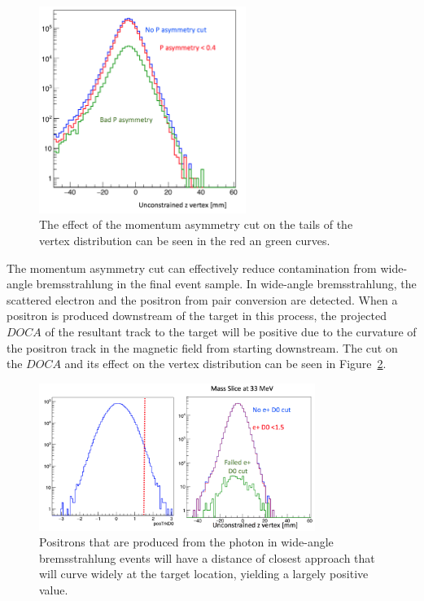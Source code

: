 \begin{figure}[H]
  \centering
      \includegraphics[width=0.6\textwidth]{plots/pasycut.png}
  \caption{The effect of the momentum asymmetry cut on the tails of the vertex distribution can be seen in the red an green curves.}
  \label{fig:pasycut}
\end{figure} 

The momentum asymmetry cut can effectively reduce contamination from wide-angle bremsstrahlung in the final event sample. In wide-angle bremsstrahlung, the scattered electron and the positron from pair conversion are detected. When a positron is produced downstream of the target in this process, the projected $DOCA$ of the resultant track to the target will be positive due to the curvature of the positron track in the magnetic field from starting downstream. The cut on the $DOCA$ and its effect on the vertex distribution can be seen in Figure~\ref{fig:docacut}. 

\begin{figure}[H]
  \centering
      \includegraphics[width=0.8\textwidth]{plots/docacut.png}
  \caption{Positrons that are produced from the photon in wide-angle bremsstrahlung events will have a distance of closest approach that will curve widely at the target location, yielding a largely positive value.}
  \label{fig:docacut}
\end{figure} 

